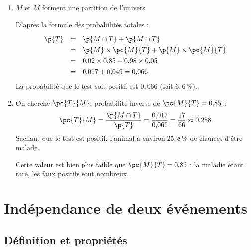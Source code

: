 \begin{methode}
\begin{correction}
\begin{enumerate}
\begin{center}
			      \end{center}

			\item $M$ et $\bar{M}$ forment une partition de l'univers.

			      D'après la formule des probabilités totales :
			      \[
				      \def\arraystretch{1.3}
				      \begin{array}{rcl}
					      \p{T} & = & \p{M \cap T} + \p{\bar{M} \cap T}                           \\
					            & = & \p{M} \times \pc{M}{T} + \p{\bar{M}} \times \pc{\bar{M}}{T} \\
					            & = & 0{,}02 \times 0{,}85 + 0{,}98 \times 0{,}05                 \\
					            & = & 0{,}017 + 0{,}049 = 0{,}066
				      \end{array}
			      \]
			      La probabilité que le test soit positif est $0{,}066$ (soit $6{,}6\,\%$).

			\item On cherche $\pc{T}{M}$, probabilité \og inverse \fg{} de $\pc{M}{T} = 0{,}85$ :
			      \[
				      \pc{T}{M} = \dfrac{\p{M \cap T}}{\p{T}} = \dfrac{0{,}017}{0{,}066} = \dfrac{17}{66} \approx 0{,}258
			      \]
			      Sachant que le test est positif, l'animal a environ $25{,}8\,\%$ de chances d'être malade.

			      Cette valeur est bien plus faible que $\pc{M}{T} = 0{,}85$ : la maladie étant rare, les faux positifs sont nombreux.
		\end{enumerate}
	\end{correction}
\end{methode}

\section{Indépendance de deux événements}

\subsection{Définition et propriétés}

